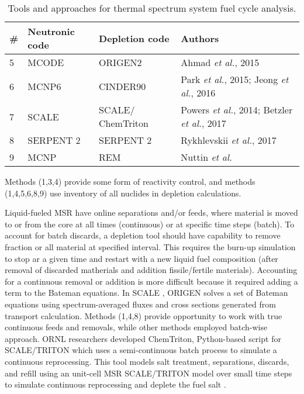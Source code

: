 \begin{table}[h!]
\centering
\caption{Tools and approaches for thermal spectrum system fuel cycle analysis.}
\begin{tabular}{ |m{}|m{}|m{}|m{}|} 
\hline
\# & Neutronic code  & Depletion code    & Authors         \\[5pt]
\hline
5 & MCODE \cite{xu_mcode_2008}      & ORIGEN2 \cite{croff_users_1980}      & Ahmad \emph{et al.}, 2015 \cite{ahmad_neutronics_2015}     \\[5pt]
\hline
6 & \gls{MCNP}6     & CINDER90 \cite{goorley_mcnp6_2013}     & Park \emph{et al.}, 2015; Jeong \emph{et al.}, 2016 \cite{park_whole_2015, jeong_equilibrium_2016}\\[5pt]
\hline
7 & SCALE \cite{bowman_scale_2011}      & SCALE/ ChemTriton \cite{powers_new_2013}    & Powers \emph{et al.}, 2014; Betzler \emph{et al.}, 2017 \cite{powers_new_2013,powers_inventory_2014,betzler_molten_2017}\\[5pt]
\hline
8 & SERPENT 2      & SERPENT 2     & Rykhlevskii \emph{et al.}, 2017 \cite{rykhlevskii_online_2017} \\[5pt]
\hline
9 & \gls{MCNP}      & REM  & Nuttin \emph{et al.} \cite{nuttin_potential_2005}    \\[5pt]
\hline
\end{tabular}
  \label{tab:th_codes}
\end{table}

Methods (1,3,4) provide some form of reactivity control, and methods (1,4,5,6,8,9) use inventory of all nuclides in depletion calculations. 

Liquid-fueled \gls{MSR} have online separations and/or feeds, where material is moved to or from the core at all times (continuous) or at specific time steps (batch). To account for batch discards, a depletion tool should have capability to remove fraction or all material at specified interval. This requires the burn-up simulation to stop ar a given time and restart with a new liquid fuel composition (after removal of discarded matherials and addition fissile/fertile materials). Accounting for a continuous removal or addition is more difficult because it required adding a term to the Bateman equations. In SCALE \cite{bowman_scale_2011}, ORIGEN \cite{gauld_isotopic_2011} solves a set of Bateman equations using spectrum-averaged fluxes and cross sections generated from transport calculation. Methods (1,4,8) provide opportunity to work with true continuous feeds and removals, while other methods employed batch-wise approach. \gls{ORNL} researchers developed ChemTriton, Python-based script for SCALE/TRITON which uses a semi-continuous batch process to simulate a continuous reprocessing. This tool models salt treatment, separations, discards, and refill using an unit-cell \gls{MSR} SCALE/TRITON model over small time steps to simulate continuous reprocessing and deplete the fuel salt \cite{powers_new_2013}.


